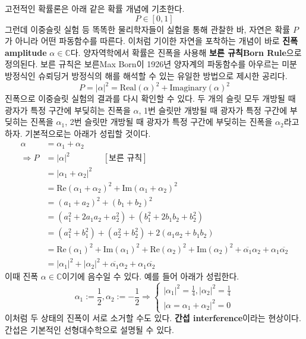 \documentclass[a4paper,chapter,atbegshi]{oblivoir}
\begin{document}
고전적인 확률론은 아래 같은 확률 개념에 기초한다.
\[
  P\in[0,1]
\]
그런데 이중슬릿 실험 등 똑똑한 물리학자들이 실험을 통해 관찰한 바, 자연은
확률 $P$가 아니라 어떤 파동함수를 따른다. 이처럼 기이한 자연을 포착하는 개념이
바로 \textbf{진폭\tiny amplitude} $\alpha\in\mathbb{C}$다. 양자역학에서 확률은
진폭을 사용해 \textbf{보른 규칙\tiny Born Rule}으로 정의된다. 보른 규칙은 
보른{\tiny Max Born}이 1926년 양자계의 파동함수를 아우르는 미분방정식인
슈뢰딩거 방정식의 해를 해석할 수 있는 유일한 방법으로 제시한 공리다.
\begin{equation}\label{eq:11}
  P = |\alpha|^2 = \textrm{Real}(\alpha)^2+\textrm{Imaginary}(\alpha)^2
\end{equation}
진폭으로 이중슬릿 실험의 결과를 다시 확인할 수 있다. 두 개의 슬릿 모두 개방될
때 광자가 특정 구간에 부딪히는 진폭을 $\alpha$, 1번 슬릿만 개방될 때 광자가
특정 구간에 부딪히는 진폭을 $\alpha_1$, 2번 슬릿만 개방될 때 광자가 특정 구간에
부딪히는 진폭을 $\alpha_2$라고 하자. 기본적으로는 아래가 성립할 것이다.
\begin{align*}
  \alpha &= \alpha_1 + \alpha_2 \\
  \Rightarrow  P &= |\alpha|^2 \quad\quad\quad\quad[\textrm{보른 규칙}]\\ 
      &= |\alpha_1+\alpha_2|^2\\
      &= \textrm{Re}(\alpha_1+\alpha_2)^2+\textrm{Im}(\alpha_1+\alpha_2)^2\\
      &= (a_1+a_2)^2+(b_1+b_2)^2 \\
      &= (a_1^2+2a_1a_2+a_2^2)+(b_1^2+2b_1b_2+b_2^2) \\
      &= (a_1^2+b_1^2)+(a_2^2+b_2^2)+2(a_1a_2+b_1b_2)\\
      &= \textrm{Re}(\alpha_1)^2+\textrm{Im}(\alpha_1)^2+
      \textrm{Re}(\alpha_2)^2+\textrm{Im}(\alpha_2)^2+\overline{\alpha_1}\alpha_2+
      \alpha_1\overline{\alpha_2}\\
      &=|\alpha_1|^2+|\alpha_2|^2+\overline{\alpha_1}\alpha_2+
          \alpha_1\overline{\alpha_2} 
\end{align*}
이때 진폭 $\alpha\in\mathbb{C}$이기에 음수일 수 있다. 예를 들어 아래가 성립한다.
\[
  \alpha_1 := \frac{1}{2}, \alpha_2 := -\frac{1}{2} \Rightarrow
  \begin{cases}
    |\alpha_1|^2 = \frac{1}{4}, |\alpha_2|^2=\frac{1}{4} \\
              |\alpha=\alpha_1+\alpha_2|^2=0
  \end{cases}
\]
이처럼 두 상태의 진폭이 서로 소거할 수도 있다. \textbf{간섭\tiny
interference}이라는 현상이다. 간섭은 기본적인 선형대수학으로 설명될 수 있다.
\end{document}
